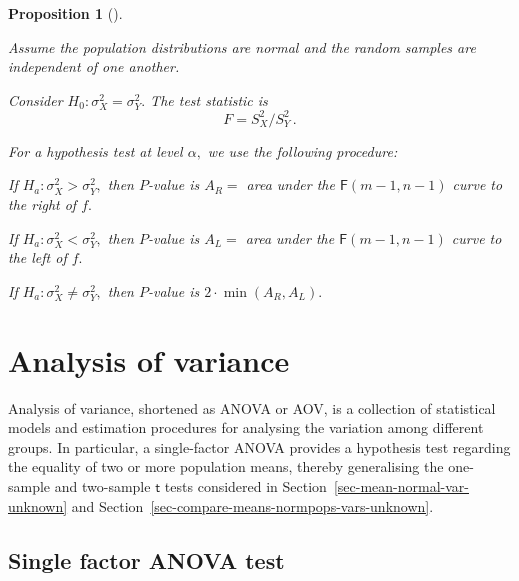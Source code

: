 \documentclass[
  a4paper,
  DIV=11,
  numbers=noendperiod,
  oneside]{scrreprt}
\theoremstyle{definition}
\theoremstyle{definition}
\theoremstyle{plain}
\newtheorem{proposition}{Proposition}[chapter]
\theoremstyle{plain}
\theoremstyle{definition}
\theoremstyle{remark}
\begin{document}
\begin{proposition}[]\protect\hypertarget{prp-htest-compre-variances}{}\label{prp-htest-compre-variances}

Assume the population distributions are normal and the random samples
are independent of one another.

Consider \(H_0 : \sigma_X^2 = \sigma_Y^2.\) The test statistic is \[
 F = S_X^2 / S_Y^2 \,.
\]

For a hypothesis test at level \(\alpha,\) we use the following
procedure:

If \(H_a : \sigma_X^2 > \sigma_Y^2,\) then \(P\)-value is \(A_R = {}\)
area under the \(\mathsf{F}(m-1, n-1)\) curve to the right of \(f.\)

If \(H_a : \sigma_X^2 < \sigma_Y^2,\) then \(P\)-value is \(A_L = {}\)
area under the \(\mathsf{F}(m-1, n-1)\) curve to the left of \(f.\)

If \(H_a : \sigma_X^2 \neq \sigma_Y^2,\) then \(P\)-value is
\(2 \cdot \min(A_R, A_L).\)

\end{proposition}

\chapter{Analysis of variance}\label{sec-anova}

Analysis of variance, shortened as ANOVA or AOV, is a collection of
statistical models and estimation procedures for analysing the variation
among different groups. In particular, a single-factor ANOVA provides a
hypothesis test regarding the equality of two or more population means,
thereby generalising the one-sample and two-sample \(\mathsf{t}\) tests
considered in Section~\ref{sec-mean-normal-var-unknown} and
Section~\ref{sec-compare-means-normpops-vars-unknown}.

\section{Single factor ANOVA test}\label{sec-anova-single-factor-test}
\end{document}
